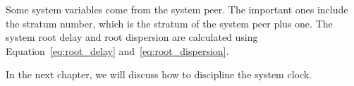 Some system variables come from the system peer. The important ones
include the stratum number, which is the stratum of the system peer plus one.
The system root delay and root dispersion are calculated using
Equation~\ref{eq:root_delay} and~\ref{eq:root_dispersion}.

In the next chapter, we will discuss how to discipline the system clock.
